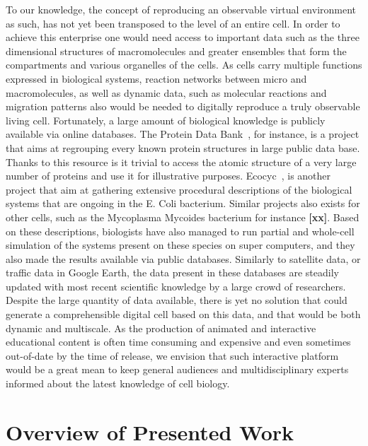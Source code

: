 To our knowledge, the concept of reproducing an observable virtual environment as such, has not yet been transposed to the level of an entire cell.
In order to achieve this enterprise one would need access to important data such as the three dimensional structures of macromolecules and greater ensembles that form the compartments and various organelles of the cells.
As cells carry multiple functions expressed in biological systems, reaction networks between micro and macromolecules, as well as dynamic data, such as molecular reactions and migration patterns also would be needed to digitally reproduce a truly observable living cell.
Fortunately, a large amount of biological knowledge is publicly available via online databases.
The Protein Data Bank~\cite{bernstein1977protein}, for instance, is a project that aims at regrouping every known protein structures in large public data base.
Thanks to this resource is it trivial to access the atomic structure of a very large number of proteins and use it for illustrative purposes.
Ecocyc~\cite{keseler2005ecocyc}, is another project that aim at gathering extensive procedural descriptions of the biological systems that are ongoing in the E. Coli bacterium.
Similar projects also exists for other cells, such as the Mycoplasma Mycoides bacterium for instance\textbf{ [xx]}.
Based on these descriptions, biologists have also managed to run partial and whole-cell simulation of the systems present on these species on super computers, and they also made the results available via public databases\cite{karr2014wholecellsimdb}.
Similarly to satellite data, or traffic data in Google Earth, the data present in these databases are steadily updated with most recent scientific knowledge by a large crowd of researchers.
Despite the large quantity of data available, there is yet no solution that could generate a comprehensible digital cell based on this data, and that would be both dynamic and multiscale.
As the production of animated and interactive educational content is often time consuming and expensive and even sometimes out-of-date by the time of release, we envision that such interactive platform would be a great mean to keep general audiences and multidisciplinary experts informed about the latest knowledge of cell biology.

\section{Overview of Presented Work}

